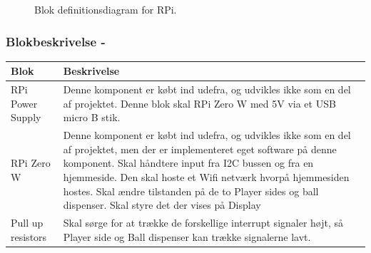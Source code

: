 \documentclass[Arkitektur/System_main.tex]{subfiles}
\begin{document}
\begin{figure}[H]
    \centering
    \caption{Blok definitionsdiagram for RPi.}
    \label{fig:rpi_hardware_bdd}
\end{figure}

\subsubsection{Blokbeskrivelse - } \label{sec:rpi_hardware_block_description}

\begin{table}[H]
\centering
\begin{tabular}{|L{0.2\columnwidth}|L{0.7\columnwidth}|}
\hline
\textbf{Blok} & \textbf{Beskrivelse} \\ \hline
RPi Power Supply & Denne komponent er købt ind udefra, og udvikles ikke som en del af projektet. Denne blok skal RPi Zero W med 5V via et USB micro B stik.\\ \hline
RPi Zero W & Denne komponent er købt ind udefra, og udvikles ikke som en del af projektet, men der er implementeret eget software på denne komponent. Skal håndtere input fra I2C bussen og fra en hjemmeside. Den skal hoste et Wifi netværk hvorpå hjemmesiden hostes. Skal ændre tilstanden på de to Player sides og ball dispenser. Skal styre det der vises på Display \\ \hline
Pull up resistors & Skal sørge for at trække de forskellige interrupt signaler højt, så Player side og Ball dispenser kan trække signalerne lavt. \\ \hline 

\end{tabular}
\end{table}
\end{document}
